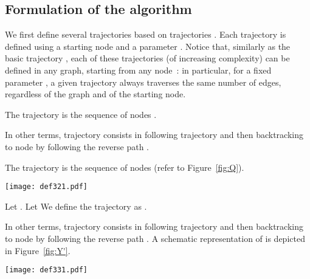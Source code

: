 \documentclass [11pt] {article}
\begin{document}
\subsection{Formulation of the algorithm}

We first define several trajectories based on trajectories . Each trajectory
is defined using a starting node  and a parameter . Notice that, similarly as the basic trajectory , each of these trajectories (of increasing complexity)
can be defined in any graph, starting from any node~: {in particular, for a fixed parameter , a given trajectory always traverses the same number of edges, regardless of the graph and of the starting node}.

\begin{definition}
The trajectory  is the sequence of nodes  .
\end{definition}

{In other terms, trajectory  consists in following trajectory  and then backtracking to node  by following the reverse path }.

\begin{definition}
\label{def:Q}
The trajectory  is the sequence of nodes  {(refer to Figure~\ref{fig:Q})}.
\end{definition}

\begin{figure*}[httb!]
	\begin{center}
	\texttt{[image: def321.pdf]}
	\caption{{A schematic representation of trajectory  which is made up of a sequence of consecutive trajectories  from  to .}}
	\label{fig:Q}
	\end{center}
\end{figure*}

\begin{definition}
\label{def:Y}
Let . Let  We define
the trajectory  as . 
\end{definition}

{In other terms, trajectory  consists in following trajectory  and then backtracking to node  by following the reverse path . A schematic representation of  is depicted in Figure~\ref{fig:Y'}.}

\begin{figure*}[httb!]
	\begin{center}
	\texttt{[image: def331.pdf]}
	\caption{{A schematic representation of trajectory  which consists in following trajectory  with the following insertions: for all , before going from node  to  the agent follows trajectory .}}
	\label{fig:Y'}
	\end{center}
\end{figure*}
\end{document}
